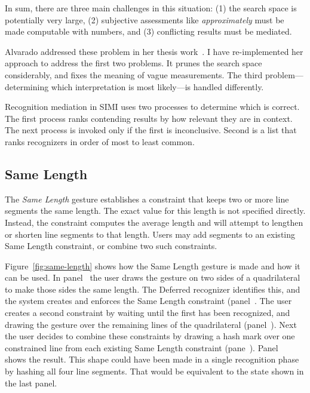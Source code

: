 In sum, there are three main challenges in this situation: (1) the
search space is potentially very large, (2) subjective assessments
like \textit{approximately} must be made computable with numbers, and
(3) conflicting results must be mediated.

Alvarado addressed these problem in her thesis
work~\cite[Ch. 4]{alvarado-phd-thesis}. I have re-implemented her
approach to address the first two problems. It prunes the search space
considerably, and fixes the meaning of vague measurements. The third
problem---determining which interpretation is most likely---is handled
differently.

Recognition mediation in SIMI uses two processes to determine which is
correct. The first process ranks contending results by how relevant
they are in context. The next process is invoked only if the first is
inconclusive. Second is a list that ranks recognizers in order of most
to least common.

\subsection{Same Length}

The \textit{Same Length} gesture establishes a constraint that keeps
two or more line segments the same length. The exact value for this
length is not specified directly. Instead, the constraint computes the
average length and will attempt to lengthen or shorten line segments
to that length. Users may add segments to an existing Same Length
constraint, or combine two such constraints. 



Figure~\ref{fig:same-length} shows how the Same Length gesture is made
and how it can be used. In panel~\textit{}
the user draws the gesture on two sides of a quadrilateral to make
those sides the same length. The Deferred recognizer identifies this,
and the system creates and enforces the Same Length constraint
(panel~\textit{}. The user creates a second
constraint by waiting until the first has been recognized, and drawing
the gesture over the remaining lines of the quadrilateral
(panel~\textit{}). Next the user decides to
combine these constraints by drawing a hash mark over one constrained
line from each existing Same Length constraint
(pane~\textit{}). Panel~\textit{}
shows the result. This shape could have been made in a single
recognition phase by hashing all four line segments. That would be
equivalent to the state shown in the last panel.

